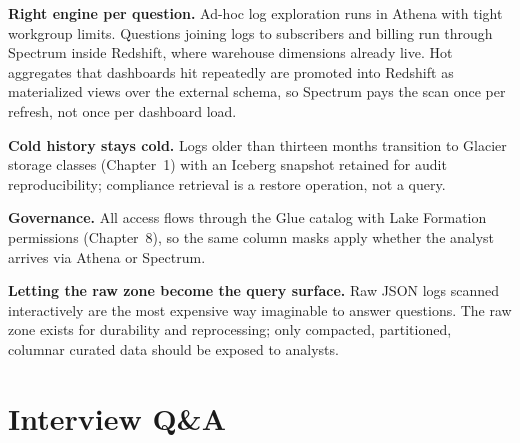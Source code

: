 \textbf{Right engine per question.} Ad-hoc log exploration runs in Athena with tight workgroup limits. Questions joining logs to subscribers and billing run through Spectrum inside Redshift, where warehouse dimensions already live. Hot aggregates that dashboards hit repeatedly are promoted into Redshift as materialized views over the external schema, so Spectrum pays the scan once per refresh, not once per dashboard load.

\textbf{Cold history stays cold.} Logs older than thirteen months transition to Glacier storage classes (Chapter~1) with an Iceberg snapshot retained for audit reproducibility; compliance retrieval is a restore operation, not a query.

\textbf{Governance.} All access flows through the Glue catalog with Lake Formation permissions (Chapter~8), so the same column masks apply whether the analyst arrives via Athena or Spectrum.

\begin{pitfall}
\textbf{Letting the raw zone become the query surface.} Raw JSON logs scanned interactively are the most expensive way imaginable to answer questions. The raw zone exists for durability and reprocessing; only compacted, partitioned, columnar curated data should be exposed to analysts.
\end{pitfall}

\section{Interview Q\&A}
